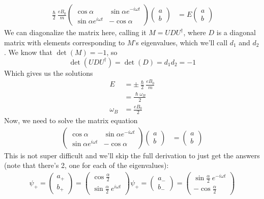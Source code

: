 \documentclass[a4paper]{article}
\begin{document}
\begin{align*}
	\frac{\hslash}{2}\frac{eB_0}{m}
	\begin{pmatrix}
		\cos\alpha & \sin\alpha e^{-i\omega t}\\
		\sin\alpha e^{i\omega t} & -\cos\alpha
	\end{pmatrix}
	\begin{pmatrix}
		a\\
		b
	\end{pmatrix}
	 &= E
	\begin{pmatrix}
		a\\
		b
	\end{pmatrix}
\end{align*}
We can diagonalize the matrix here, calling it $M = UDU^\dagger$, where $D$ is
a diagonal matrix with elements corresponding to $M$'s eigenvalues, which we'll
call $d_1$ and $d_2$. We know that $\det(M) = -1$, so
\[
	\det(UDU^\dagger) = \det(D) = d_1d_2 = -1
\]
Which gives us the solutions
\begin{align*}
	E &= \pm\frac{\hslash}{2} \frac{eB_0}{m}\\
	&= \frac{\hslash\omega_B}{2}\\
	\omega_B &= \frac{eB_0}{2}
\end{align*}
Now, we need to solve the matrix equation
\begin{align*}
	\begin{pmatrix}
		\cos\alpha & \sin\alpha e^{-i\omega t}\\
		\sin\alpha e^{i\omega t} & -\cos\alpha
	\end{pmatrix}
	\begin{pmatrix}
		a\\
		b
	\end{pmatrix}
	 &=
	\begin{pmatrix}
		a\\
		b
	\end{pmatrix}
\end{align*}
This is not super difficult and we'll skip the full derivation to just get the
answers (note that there's 2, one for each of the eigenvalues):
\begin{align*}
	\psi_+ = \begin{pmatrix} a_+\\b_+ \end{pmatrix} =
	\begin{pmatrix}
		\cos\frac{\alpha}{2}\\
		\sin\frac{\alpha}{2}\ e^{i\omega t}
	\end{pmatrix}
	\psi_+ = \begin{pmatrix} a_-\\b_- \end{pmatrix} =
	\begin{pmatrix}
		\sin\frac{\alpha}{2}\ e^{-i\omega t}\\
		-\cos\frac{\alpha}{2}
	\end{pmatrix}
\end{align*}
\end{document}

